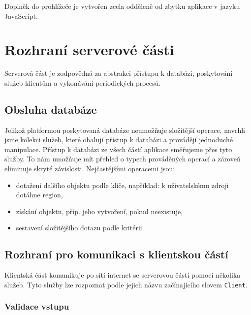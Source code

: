 Doplněk do prohlížeče je vytvořen zcela odděleně od zbytku aplikace v jazyku JavaScript.

\section{Rozhraní serverové části}

Serverová část je zodpovědná za abstrakci přístupu k databázi, poskytování služeb klientům a vykonávání periodických procesů.

\subsection{Obsluha databáze}
Jelikož platformou poskytovaná databáze neumožňuje složitější operace, navrhli jsme kolekci služeb, které obalují přístup k databázi a provádějí jednoduché manipulace.
Přístup k databázi ze všech částí aplikace směřujeme přes tyto služby.
To nám umožňuje mít přehled o typech prováděných operací a zároveň eliminuje skryté závislosti.
Nejčastějšími operacemi jsou:
\begin{itemize}
	\item dotažení dalšího objektu podle klíče, například: k uživatelskému zdroji dotáhne region,
	\item získání objektu, příp. jeho vytvoření, pokud neexistuje,
	\item sestavení složitějšího dotazu podle kritérii.
\end{itemize}

\subsection{Rozhraní pro komunikaci s klientskou částí}

Klientská část komunikuje po síti internet se serverovou částí pomocí několika služeb.
Tyto služby lze rozpoznat podle jejich názvu začínajícího slovem \verb|Client|.

\subsubsection{Validace vstupu}

